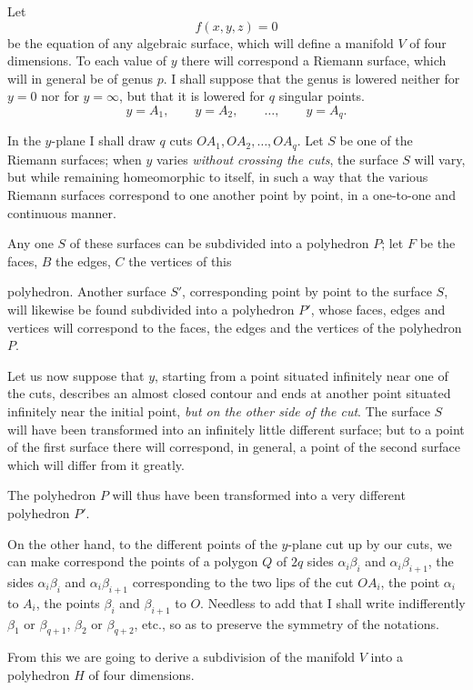 \documentclass{article}
\begin{document}
Let
\[ f(x, y, z) = 0 \tag{1} \]
be the equation of any algebraic surface, which will define a manifold $V$ of four dimensions. To each value of $y$ there will correspond a Riemann surface, which will in general be of genus $p$. I shall suppose that the genus is lowered neither for $y = 0$ nor for $y = \infty$, but that it is lowered for $q$ singular points.
\[ y = A_{1}, \qquad y = A_{2}, \qquad \ldots, \qquad y = A_{q}. \]

In the $y$-plane I shall draw $q$ cuts $OA_{1}, OA_{2}, \ldots, OA_{q}$. Let $S$ be one of the Riemann surfaces; when $y$ varies \emph{without crossing the cuts}, the surface $S$ will vary, but while remaining homeomorphic to itself, in such a way that the various Riemann surfaces correspond to one another point by point, in a one-to-one and continuous manner.

Any one $S$ of these surfaces can be subdivided into a polyhedron $P$; let $F$ be the faces, $B$ the edges, $C$ the vertices of this

polyhedron. Another surface $S'$, corresponding point by point to the surface $S$, will likewise be found subdivided into a polyhedron $P'$, whose faces, edges and vertices will correspond to the faces, the edges and the vertices of the polyhedron $P$.

Let us now suppose that $y$, starting from a point situated infinitely near one of the cuts, describes an almost closed contour and ends at another point situated infinitely near the initial point, \emph{but on the other side of the cut}. The surface $S$ will have been transformed into an infinitely little different surface; but to a point of the first surface there will correspond, in general, a point of the second surface which will differ from it greatly.

The polyhedron $P$ will thus have been transformed into a very different polyhedron $P'$.

On the other hand, to the different points of the $y$-plane cut up by our cuts, we can make correspond the points of a polygon $Q$ of $2q$ sides $\alpha_{i}\beta_{i}$ and $\alpha_{i}\beta_{i+1}$, the sides $\alpha_{i}\beta_{i}$ and $\alpha_{i}\beta_{i+1}$ corresponding to the two lips of the cut $OA_{i}$, the point $\alpha_{i}$ to $A_{i}$, the points $\beta_{i}$ and $\beta_{i+1}$ to $O$. Needless to add that I shall write indifferently $\beta_{1}$ or $\beta_{q+1}$, $\beta_{2}$ or $\beta_{q+2}$, etc., so as to preserve the symmetry of the notations.

From this we are going to derive a subdivision of the manifold $V$ into a polyhedron $H$ of four dimensions.
\end{document}
